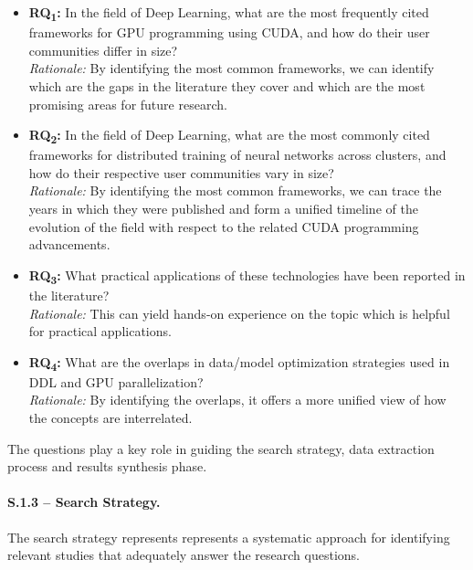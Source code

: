 \begin{itemize}
	\item \textbf{RQ\textsubscript{1}:} In the field of Deep Learning, what are the most frequently cited
	      frameworks for GPU programming using CUDA, and how do their user communities differ in size? \\
	      \textit{Rationale:} By identifying the most common frameworks, we can identify which are the gaps
	      in the literature they cover and which are the most promising areas for future research.

	\item \textbf{RQ\textsubscript{2}:} In the field of Deep Learning, what are the most commonly cited
	      frameworks for distributed training of neural networks across clusters, and how do their respective user communities vary in size? \\
	      \textit{Rationale:} By identifying the most common frameworks, we can trace the years in which they were published
	      and form a unified timeline of the evolution of the field with respect to the related CUDA programming advancements.

	\item \textbf{RQ\textsubscript{3}:} What practical applications of these technologies have been reported in the literature? \\
	      \textit{Rationale:} This can yield hands-on experience on the topic which is helpful for practical applications.
	\item \textbf{RQ\textsubscript{4}:} What are the overlaps in data/model optimization strategies used in DDL and GPU parallelization? \\
	      \textit{Rationale:} By identifying the overlaps, it offers a more unified view of how the concepts are interrelated.
\end{itemize}

The questions play a key role in guiding the search strategy, data extraction process and results
synthesis phase.

\paragraph{S.1.3 -- Search Strategy.}
The search strategy represents represents a systematic approach for identifying relevant studies
that adequately answer the research questions.

